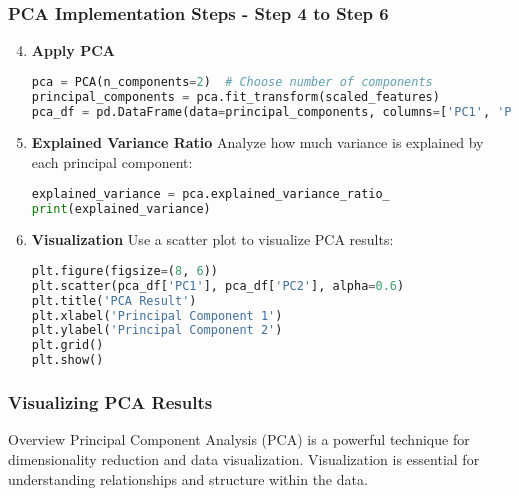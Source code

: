 \documentclass[aspectratio=169]{beamer}
\begin{document}
\begin{frame}[fragile]
    \frametitle{PCA Implementation Steps - Step 4 to Step 6}
    \begin{enumerate}
        \setcounter{enumi}{3}
        \item \textbf{Apply PCA}
        \begin{lstlisting}[language=Python]
pca = PCA(n_components=2)  # Choose number of components
principal_components = pca.fit_transform(scaled_features)
pca_df = pd.DataFrame(data=principal_components, columns=['PC1', 'PC2'])
        \end{lstlisting}

        \item \textbf{Explained Variance Ratio}
        Analyze how much variance is explained by each principal component:
        \begin{lstlisting}[language=Python]
explained_variance = pca.explained_variance_ratio_
print(explained_variance)
        \end{lstlisting}

        \item \textbf{Visualization}
        Use a scatter plot to visualize PCA results:
        \begin{lstlisting}[language=Python]
plt.figure(figsize=(8, 6))
plt.scatter(pca_df['PC1'], pca_df['PC2'], alpha=0.6)
plt.title('PCA Result')
plt.xlabel('Principal Component 1')
plt.ylabel('Principal Component 2')
plt.grid()
plt.show()
        \end{lstlisting}
    \end{enumerate}
\end{frame}

\begin{frame}[fragile]
    \frametitle{Visualizing PCA Results}
    
    \begin{block}{Overview}
        Principal Component Analysis (PCA) is a powerful technique for dimensionality reduction and data visualization. Visualization is essential for understanding relationships and structure within the data.
    \end{block}
\end{frame}
\end{document}
